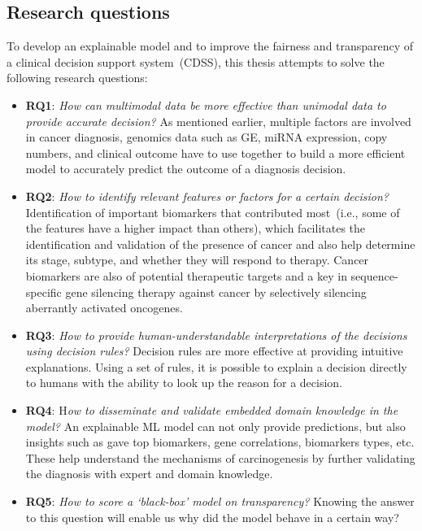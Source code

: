 \subsection{Research questions}
To develop an explainable model and to improve the fairness and transparency of a clinical decision support system~(CDSS), this thesis attempts to solve the following research questions: 

\vspace{-2mm}
\begin{itemize}[noitemsep]
    \item \textbf{RQ1}: \textit{How can multimodal data be more effective than unimodal data to provide accurate decision?} As mentioned earlier, multiple factors are involved in cancer diagnosis, genomics data such as GE, miRNA expression, copy numbers, and clinical outcome have to use together to build a more efficient model to accurately predict the outcome of a diagnosis decision.  
    \item \textbf{RQ2}: \textit{How to identify relevant features or factors for a certain decision?} Identification of important biomarkers that contributed most~(i.e., some of the features have a higher impact than others), which facilitates the identification and validation of the presence of cancer and also help determine its stage, subtype, and whether they will respond to therapy. Cancer biomarkers are also of potential therapeutic targets and a key in sequence-specific gene silencing therapy against cancer by selectively silencing aberrantly activated oncogenes.  
    \item \textbf{RQ3}: \textit{How to provide human-understandable interpretations of the decisions using decision rules?} Decision rules are more effective at providing intuitive explanations. Using a set of rules, it is possible to explain a decision directly to humans with the ability to look up the reason for a decision. 
    \item \textbf{RQ4}: H\textit{ow to disseminate and validate embedded domain knowledge in the model?} An explainable ML model can not only provide predictions, but also insights such as gave top biomarkers, gene correlations, biomarkers types, etc. These help understand the mechanisms of carcinogenesis by further validating the diagnosis with expert and domain knowledge. 
    \item \textbf{RQ5}: \textit{How to score a `black-box' model on transparency?} Knowing the answer to this question will enable us why did the model behave in a certain way? 
\end{itemize}
\vspace{-2mm}

